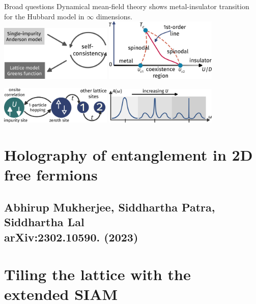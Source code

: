 \documentclass[aspectratio=169]{beamer}
\begin{document}
\begin{frame}{Broad questions}
Dynamical mean-field theory shows \alert{metal-insulator transition}\\ for the Hubbard model in \(\infty\) dimensions.\\
\includegraphics[width=0.4\textwidth]{selfconsistency.pdf}
\hspace*{\fill}
\includegraphics[width=0.4\textwidth]{coexistence-dmft.pdf}

\vspace*{\fill}
\includegraphics[width=0.4\textwidth]{siam_schematic.pdf}
\includegraphics[width=0.4\textwidth]{standard-siam.pdf}

\end{frame}
\section{Holography of entanglement in 2D free fermions}
\subsection{Abhirup Mukherjee, Siddhartha Patra, Siddhartha Lal\\ arXiv:2302.10590. (2023)}

\section{Tiling the lattice with the extended SIAM}
\end{document}
